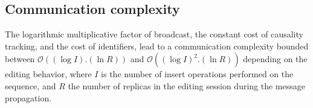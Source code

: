 
\subsection{Communication complexity}

The logarithmic multiplicative factor of broadcast, the constant cost of
causality tracking, and the cost of identifiers, lead to a communication
complexity bounded between $\mathcal{O}((\log I).(\ln R))$ and
$\mathcal{O}((\log I)^2.(\ln R))$ depending on the editing behavior, where $I$
is the number of insert operations performed on the sequence, and $R$ the number
of replicas in the editing session during the message propagation.







